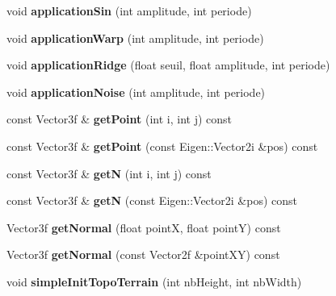 \begin{DoxyCompactItemize}
\item 
\hypertarget{class_mesh_a704686a9be93522a1b689f3efd2bf3d4}{}void {\bfseries application\+Sin} (int amplitude, int periode)\label{class_mesh_a704686a9be93522a1b689f3efd2bf3d4}

\item 
\hypertarget{class_mesh_a84c4915e502ef96f7612809e9eb1a7bd}{}void {\bfseries application\+Warp} (int amplitude, int periode)\label{class_mesh_a84c4915e502ef96f7612809e9eb1a7bd}

\item 
\hypertarget{class_mesh_a6fec1967d38a3cbe57991013aed0a8a3}{}void {\bfseries application\+Ridge} (float seuil, float amplitude, int periode)\label{class_mesh_a6fec1967d38a3cbe57991013aed0a8a3}

\item 
\hypertarget{class_mesh_ae8ddd801334b35b12b988f0b4ecdc578}{}void {\bfseries application\+Noise} (int amplitude, int periode)\label{class_mesh_ae8ddd801334b35b12b988f0b4ecdc578}

\item 
\hypertarget{class_mesh_a3e17a5eb0812e045c14ec54b4b161c77}{}const Vector3f \& {\bfseries get\+Point} (int i, int j) const \label{class_mesh_a3e17a5eb0812e045c14ec54b4b161c77}

\item 
\hypertarget{class_mesh_ad9ad10e9b7e9e80a0854d72ac4dd0bad}{}const Vector3f \& {\bfseries get\+Point} (const Eigen\+::\+Vector2i \&pos) const \label{class_mesh_ad9ad10e9b7e9e80a0854d72ac4dd0bad}

\item 
\hypertarget{class_mesh_a51190fa546b8330e228d9d03584dfccf}{}const Vector3f \& {\bfseries get\+N} (int i, int j) const \label{class_mesh_a51190fa546b8330e228d9d03584dfccf}

\item 
\hypertarget{class_mesh_a58b2de27bca11a60a5030b3b81987d46}{}const Vector3f \& {\bfseries get\+N} (const Eigen\+::\+Vector2i \&pos) const \label{class_mesh_a58b2de27bca11a60a5030b3b81987d46}

\item 
\hypertarget{class_mesh_aff70dcab51bb85910d2d2c0200421e18}{}Vector3f {\bfseries get\+Normal} (float point\+X, float point\+Y) const \label{class_mesh_aff70dcab51bb85910d2d2c0200421e18}

\item 
\hypertarget{class_mesh_a6ad91e73f1ee8e856f78232375b0109e}{}Vector3f {\bfseries get\+Normal} (const Vector2f \&point\+X\+Y) const \label{class_mesh_a6ad91e73f1ee8e856f78232375b0109e}

\item 
\hypertarget{class_mesh_a74b52ba5f2cafbd198aeb0c174f94702}{}void {\bfseries simple\+Init\+Topo\+Terrain} (int nb\+Height, int nb\+Width)\label{class_mesh_a74b52ba5f2cafbd198aeb0c174f94702}

\end{DoxyCompactItemize}
